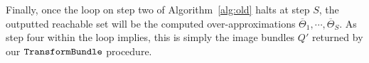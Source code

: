 
Finally, once the loop on step two of Algorithm~\ref{alg:old} halts at step $S$, the outputted reachable set will be the computed over-approximations $\overline\Theta_1, \cdots, \overline\Theta_S$. As step four within the loop implies, this is simply the image bundles $Q'$ returned by our $\texttt{TransformBundle}$ procedure.







